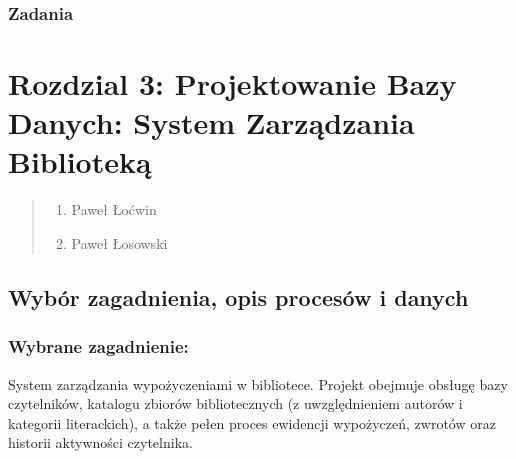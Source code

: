 \documentclass[letterpaper,10pt,english]{sphinxmanual}
\begin{document}
\subsection{Zadania}
\label{\detokenize{rozdzial_2/rozdzial_28/source/rozdzial_3/index:zadania}}\label{\detokenize{rozdzial_2/rozdzial_28/source/rozdzial_3/index::doc}}
\sphinxstepscope


\chapter{Rozdzial 3: Projektowanie Bazy Danych: System Zarządzania Biblioteką}
\label{\detokenize{rozdzial_3/index:rozdzial-3-projektowanie-bazy-danych-system-zarzadzania-biblioteka}}\label{\detokenize{rozdzial_3/index::doc}}\begin{quote}\begin{description}
\begin{enumerate}
%
\item {} 
\sphinxAtStartPar
Paweł Łoćwin

\item {} 
\sphinxAtStartPar
Paweł Łosowski

\end{enumerate}

\end{description}\end{quote}


\section{Wybór zagadnienia, opis procesów i danych}
\label{\detokenize{rozdzial_3/index:wybor-zagadnienia-opis-procesow-i-danych}}

\subsection{Wybrane zagadnienie:}
\label{\detokenize{rozdzial_3/index:wybrane-zagadnienie}}
\sphinxAtStartPar
System zarządzania wypożyczeniami w bibliotece.
Projekt obejmuje obsługę bazy czytelników, katalogu zbiorów bibliotecznych (z uwzględnieniem autorów i kategorii literackich), a także pełen proces ewidencji wypożyczeń, zwrotów oraz historii aktywności czytelnika.
\end{document}
